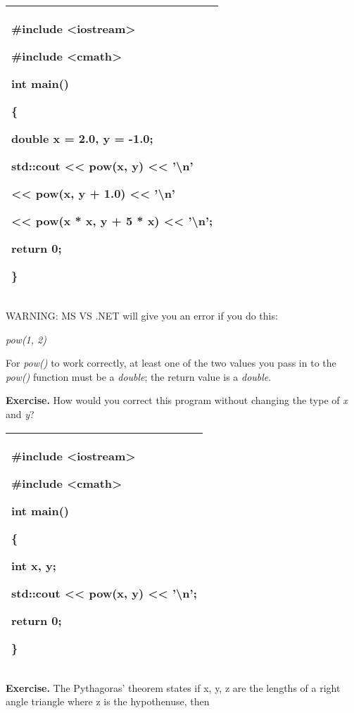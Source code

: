 \documentclass[
]{article}
\begin{document}
\begin{longtable}[]{@{}l@{}}
\toprule
\endhead
\begin{minipage}[t]{0.97\columnwidth}\raggedright
\#include \textless iostream\textgreater{}

\#include \textless cmath\textgreater{}

int main()

\{

double x = 2.0, y = -1.0;

std::cout \textless\textless{} pow(x, y) \textless\textless{}
'\textbackslash n'

\textless\textless{} pow(x, y + 1.0) \textless\textless{}
'\textbackslash n'

\textless\textless{} pow(x * x, y + 5 * x) \textless\textless{}
'\textbackslash n';

return 0;

\}\strut
\end{minipage}\tabularnewline
\bottomrule
\end{longtable}

WARNING: MS VS .NET will give you an error if you do this:

\emph{pow(1, 2)}

For \emph{pow()} to work correctly, at least one of the two values you
pass in to the \emph{pow()} function must be a \emph{double}; the return
value is a \emph{double}.

\textbf{Exercise.} How would you correct this program without changing
the type of \emph{x} and \emph{y}?

\begin{longtable}[]{@{}l@{}}
\toprule
\endhead
\begin{minipage}[t]{0.97\columnwidth}\raggedright
\#include \textless iostream\textgreater{}

\#include \textless cmath\textgreater{}

int main()

\{

int x, y;

std::cout \textless\textless{} pow(x, y) \textless\textless{}
'\textbackslash n';

return 0;

\}\strut
\end{minipage}\tabularnewline
\bottomrule
\end{longtable}

\textbf{Exercise.} The Pythagoras' theorem states if x, y, z are the
lengths of a right angle triangle where z is the hypothenuse, then
\end{document}
